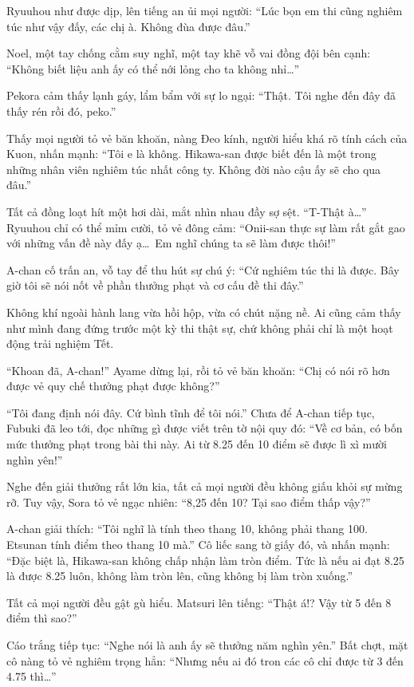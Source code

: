 \documentclass[../main.tex]{subfiles}
\begin{document}
Ryuuhou như được dịp, lên tiếng an ủi mọi người: ``Lúc bọn em thi cũng nghiêm túc như vậy đấy, các chị à. Không đùa được đâu.''

Noel, một tay chống cằm suy nghĩ, một tay khẽ vỗ vai đồng đội bên cạnh: ``Không biết liệu anh ấy có thể nới lỏng cho ta không nhỉ\dots''

Pekora cảm thấy lạnh gáy, lẩm bẩm với sự lo ngại: ``Thật. Tôi nghe đến đây đã thấy rén rồi đó, peko.''

Thấy mọi người tỏ vẻ băn khoăn, nàng Đeo kính, người hiểu khá rõ tính cách của Kuon, nhấn mạnh: ``Tôi e là không. Hikawa-san được biết đến là một trong những nhân viên nghiêm túc nhất công ty. Không đời nào cậu ấy sẽ cho qua đâu.''

Tất cả đồng loạt hít một hơi dài, mắt nhìn nhau đầy sợ sệt. ``T-Thật à\dots'' Ryuuhou chỉ có thể mỉm cười, tỏ vẻ đông cảm: ``Onii-san thực sự làm rất gắt gao với những vấn đề này đấy ạ\dots\ Em nghĩ chúng ta sẽ làm được thôi!''

A-chan cố trấn an, vỗ tay để thu hút sự chú ý: ``Cứ nghiêm túc thi là được. Bây giờ tôi sẽ nói nốt về phần thưởng phạt và cơ cấu đề thi đây.''

Không khí ngoài hành lang vừa hồi hộp, vừa có chút nặng nề. Ai cũng cảm thấy như mình đang đứng trước một kỳ thi thật sự, chứ không phải chỉ là một hoạt động trải nghiệm Tết.

``Khoan đã, A-chan!'' Ayame dừng lại, rồi tỏ vẻ băn khoăn: ``Chị có nói rõ hơn được vẻ quy chế thưởng phạt được không?''

``Tôi đang định nói đây. Cứ bình tĩnh để tôi nói.'' Chưa để A-chan tiếp tục, Fubuki đã leo tới, đọc những gì được viết trên tờ nội quy đó: ``Về cơ bản, có bốn mức thưởng phạt trong bài thi này. Ai từ 8.25 đến 10 điểm sẽ được lì xì mười nghìn yên!''

Nghe đến giải thưởng rất lớn kia, tất cả mọi người đều không giấu khỏi sự mừng rỡ. Tuy vậy, Sora tỏ vẻ ngạc nhiên: ``8,25 đến 10? Tại sao điểm thấp vậy?''

A-chan giải thích: ``Tôi nghĩ là tính theo thang 10, không phải thang 100. Etsunan tính điểm theo thang 10 mà.'' Cô liếc sang tờ giấy đó, và nhấn mạnh: ``Đặc biệt là, Hikawa-san không chấp nhận làm tròn điểm. Tức là nếu ai đạt 8.25 là được 8.25 luôn, không làm tròn lên, cũng không bị làm tròn xuống.''

Tất cả mọi người đều gật gù hiểu. Matsuri lên tiếng: ``Thật á!? Vậy từ 5 đến 8 điểm thì sao?''

Cáo trắng tiếp tục: ``Nghe nói là anh ấy sẽ thưởng năm nghìn yên.'' Bất chợt, mặt cô nàng tỏ vẻ nghiêm trọng hẳn: ``Nhưng nếu ai đó tron các cô chỉ được từ 3 đến 4.75 thì\dots''
\end{document}
